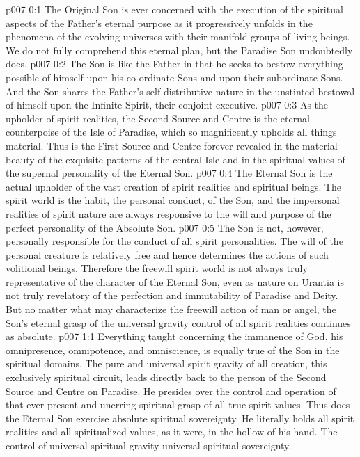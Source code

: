 \author{Divine Counsellor}
\vs p007 0:1 The Original Son is ever concerned with the execution of the spiritual aspects of the Father’s eternal purpose as it progressively unfolds in the phenomena of the evolving universes with their manifold groups of living beings. We do not fully comprehend this eternal plan, but the Paradise Son undoubtedly does.
\vs p007 0:2 The Son is like the Father in that he seeks to bestow everything possible of himself upon his co\hyp{}ordinate Sons and upon their subordinate Sons. And the Son shares the Father’s self\hyp{}distributive nature in the unstinted bestowal of himself upon the Infinite Spirit, their conjoint executive.
\vs p007 0:3 \pc As the upholder of spirit realities, the Second Source and Centre is the eternal counterpoise of the Isle of Paradise, which so magnificently upholds all things material. Thus is the First Source and Centre forever revealed in the material beauty of the exquisite patterns of the central Isle and in the spiritual values of the supernal personality of the Eternal Son.
\vs p007 0:4 \pc The Eternal Son is the actual upholder of the vast creation of spirit realities and spiritual beings. The spirit world is the habit, the personal conduct, of the Son, and the impersonal realities of spirit nature are always responsive to the will and purpose of the perfect personality of the Absolute Son.
\vs p007 0:5 The Son is not, however, personally responsible for the conduct of all spirit personalities. The will of the personal creature is relatively free and hence determines the actions of such volitional beings. Therefore the freewill spirit world is not always truly representative of the character of the Eternal Son, even as nature on Urantia is not truly revelatory of the perfection and immutability of Paradise and Deity. But no matter what may characterize the freewill action of man or angel, the Son’s eternal grasp of the universal gravity control of all spirit realities continues as absolute.
\vs p007 1:1 Everything taught concerning the immanence of God, his omnipresence, omnipotence, and omniscience, is equally true of the Son in the spiritual domains. The pure and universal spirit gravity of all creation, this exclusively spiritual circuit, leads directly back to the person of the Second Source and Centre on Paradise. He presides over the control and operation of that ever\hyp{}present and unerring spiritual grasp of all true spirit values. Thus does the Eternal Son exercise absolute spiritual sovereignty. He literally holds all spirit realities and all spiritualized values, as it were, in the hollow of his hand. The control of universal spiritual gravity  universal spiritual sovereignty.
